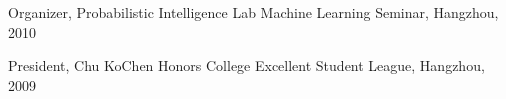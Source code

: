 \documentclass[margin,line]{res}
\newenvironment{list2}{
  \begin{list}{$\bullet$}{%
      \setlength{\itemsep}{0in}
      \setlength{\parsep}{0in} \setlength{\parskip}{0in}
      \setlength{\topsep}{0in} \setlength{\partopsep}{0in} 
      \setlength{\leftmargin}{0.2in}}}{\end{list}}
\begin{document}
\begin{resume}
Organizer, Probabilistic Intelligence Lab Machine Learning Seminar, Hangzhou, 2010

President, Chu KoChen Honors College Excellent Student League, Hangzhou, 2009


%
%
%
%



\end{resume}
\end{document}
